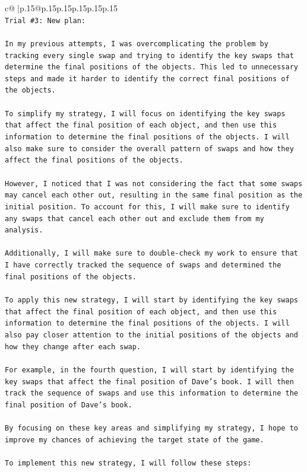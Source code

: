 \documentclass{article}
\begin{document}
{\begin{supertabular}{c@{$\;$}|p{.15\linewidth}@{}p{.15\linewidth}p{.15\linewidth}p{.15\linewidth}p{.15\linewidth}p{.15\linewidth}}
{{{\\ 
\texttt{Trial \#3: New plan: } \\
\\ 
\texttt{In my previous attempts, I was overcomplicating the problem by tracking every single swap and trying to identify the key swaps that determine the final positions of the objects. This led to unnecessary steps and made it harder to identify the correct final positions of the objects.} \\
\\ 
\texttt{To simplify my strategy, I will focus on identifying the key swaps that affect the final position of each object, and then use this information to determine the final positions of the objects. I will also make sure to consider the overall pattern of swaps and how they affect the final positions of the objects.} \\
\\ 
\texttt{However, I noticed that I was not considering the fact that some swaps may cancel each other out, resulting in the same final position as the initial position. To account for this, I will make sure to identify any swaps that cancel each other out and exclude them from my analysis.} \\
\\ 
\texttt{Additionally, I will make sure to double{-}check my work to ensure that I have correctly tracked the sequence of swaps and determined the final positions of the objects.} \\
\\ 
\texttt{To apply this new strategy, I will start by identifying the key swaps that affect the final position of each object, and then use this information to determine the final positions of the objects. I will also pay closer attention to the initial positions of the objects and how they change after each swap.} \\
\\ 
\texttt{For example, in the fourth question, I will start by identifying the key swaps that affect the final position of Dave's book. I will then track the sequence of swaps and use this information to determine the final position of Dave's book.} \\
\\ 
\texttt{By focusing on these key areas and simplifying my strategy, I hope to improve my chances of achieving the target state of the game.} \\
\\ 
\texttt{To implement this new strategy, I will follow these steps:} \\
}}}
\end{supertabular}}
\end{document}
